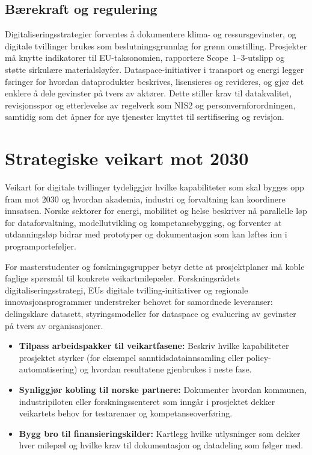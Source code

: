 \subsection{Bærekraft og regulering}
Digitaliseringsstrategier forventes å dokumentere klima- og ressursgevinster, og digitale tvillinger brukes som beslutningsgrunnlag for grønn omstilling. Prosjekter må knytte indikatorer til EU-taksonomien, rapportere Scope~1--3-utslipp og støtte sirkulære materialsløyfer. Dataspace-initiativer i transport og energi legger føringer for hvordan dataprodukter beskrives, lisensieres og revideres, og gjør det enklere å dele gevinster på tvers av aktører.\citep{ec2023mobilitydataspace} Dette stiller krav til datakvalitet, revisjonsspor og etterlevelse av regelverk som NIS2 og personvernforordningen, samtidig som det åpner for nye tjenester knyttet til sertifisering og revisjon.

\section{Strategiske veikart mot 2030}
Veikart for digitale tvillinger tydeliggjør hvilke kapabiliteter som skal bygges opp fram mot 2030 og hvordan akademia, industri og forvaltning kan koordinere innsatsen.\citep{rcn2023veikart,eu2024digitaltwinroadmap} Norske sektorer for energi, mobilitet og helse beskriver nå parallelle løp for dataforvaltning, modellutvikling og kompetansebygging, og forventer at utdanningsløp bidrar med prototyper og dokumentasjon som kan løftes inn i programporteføljer.

For masterstudenter og forskningsgrupper betyr dette at prosjektplaner må koble faglige spørsmål til konkrete veikartmilepæler. Forskningsrådets digitaliseringsstrategi, EUs digitale tvilling-initiativer og regionale innovasjonsprogrammer understreker behovet for samordnede leveranser: delingsklare datasett, styringsmodeller for dataspace og evaluering av gevinster på tvers av organisasjoner.\citep{rcn2023veikart,rcn2024digitalisering}

\begin{itemize}
    \item \textbf{Tilpass arbeidspakker til veikartfasene:} Beskriv hvilke kapabiliteter prosjektet styrker (for eksempel sanntidsdatainnsamling eller policy-automatisering) og hvordan resultatene gjenbrukes i neste fase.
    \item \textbf{Synliggjør kobling til norske partnere:} Dokumenter hvordan kommunen, industripiloten eller forskningssenteret som inngår i prosjektet dekker veikartets behov for testarenaer og kompetanseoverføring.
    \item \textbf{Bygg bro til finansieringskilder:} Kartlegg hvilke utlysninger som dekker hver milepæl og hvilke krav til dokumentasjon og datadeling som følger med.
\end{itemize}

